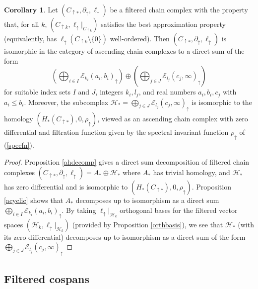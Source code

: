\documentclass[11pt]{amsart}
\theoremstyle{definition}
\newtheorem{cor}[theorem]{Corollary}
\theoremstyle{remark}
\numberwithin{equation}{section}
\begin{document}
\begin{cor}\label{ascsplit}
	Let $(C_{\uparrow *},\partial_{\uparrow},\ell_{\uparrow})$ be a filtered chain complex with the property that, for all $k$, $(C_{\uparrow k},\ell_{\uparrow}|_{C_{\uparrow k}})$ satisfies the best approximation property (equivalently, has $\ell_{\uparrow}(C_{\uparrow k}\setminus\{0\})$ well-ordered).  Then $(C_{\uparrow *},\partial_{\uparrow},\ell_{\uparrow})$ is isomorphic in the category of ascending chain complexes
	to a direct sum of the form \begin{equation}\label{ascspliteqn} \left(\bigoplus_{i\in I} \mathcal{E}_{k_i}(a_i,b_i)_{\uparrow}\right)\oplus\left(\bigoplus_{j\in J} \mathcal{E}_{l_j}(c_j,\infty)_{\uparrow} \right) \end{equation} for suitable index sets $I$ and $J$, integers $k_i,l_j$, and real numbers $a_i,b_i,c_j$ with $a_i\leq b_i$.  Moreover, the subcomplex $\mathcal{H}_*=\bigoplus_{j\in J} \mathcal{E}_{l_j}(c_j,\infty)_{\uparrow}$ is isomorphic to the homology $(H_*(C_{\uparrow *}),0,\rho_{\uparrow})$, viewed as an ascending chain complex with zero differential and filtration function given by the spectral invariant function $\rho_{\uparrow}$ of (\ref{specfn}).
\end{cor}

\begin{proof}
	Proposition \ref{ahdecomp} gives a direct sum decomposition of filtered chain complexes $(C_{\uparrow *},\partial_{\uparrow},\ell_{\uparrow})=A_*\oplus \mathcal{H}_*$ where $A_*$ has trivial homology, and $\mathcal{H}_*$ has zero differential and is isomorphic to $(H_*(C_{\uparrow*}),0,\rho_{\uparrow})$.  Proposition \ref{acyclic} shows that $A_*$ decomposes up to isomorphism as a direct sum $\bigoplus_{i\in I} \mathcal{E}_{k_i}(a_i,b_i)_{\uparrow}$.  By taking  $\ell_{\uparrow}|_{\mathcal{H}_k}$ orthogonal bases for the filtered vector spaces $(\mathcal{H}_k,\ell_{\uparrow}|_{\mathcal{H}_k})$ (provided by Proposition \ref{orthbasis}), we see that $\mathcal{H}_*$ (with its zero differential) decomposes up to isomorphism as a direct sum of the form $\bigoplus_{j\in J} \mathcal{E}_{l_j}(c_j,\infty)_{\uparrow}$   
\end{proof}

\subsection{Filtered cospans}\label{cospan-decomp}
\end{document}

